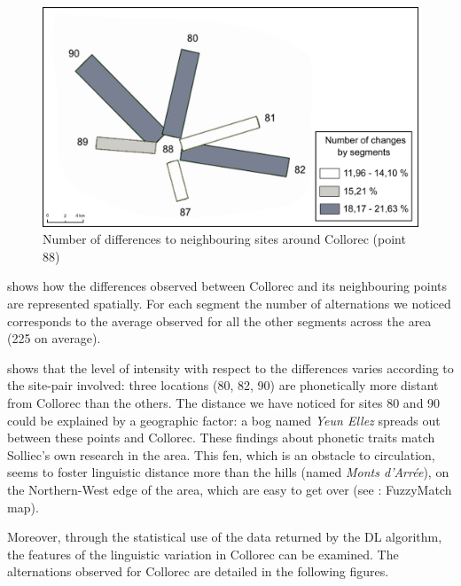 \documentclass[output=paper]{LSP/langsci}
\begin{document}
\begin{figure}
\includegraphics[width=\textwidth]{illustrations/brun_etal_fig7}
\caption{Number of differences to neighbouring sites around Collorec (point 88)}
\label{fig:7}
\end{figure}

 shows how the differences observed between Collorec and its neighbouring points are represented spatially. For each segment the number of alternations we noticed corresponds to the average observed for all the other segments across the area (225 on average).

 shows that the level of intensity with respect to the differences varies according to the site-pair involved: three locations (80, 82, 90) are phonetically more distant from Collorec than the others. The distance we have noticed for sites 80 and 90 could be explained by a geographic factor: a bog named \textit{Yeun Ellez} spreads out between these points and Collorec. These findings about phonetic traits match Solliec’s own research in the area. This fen, which is an obstacle to circulation, seems to foster linguistic distance more than the hills (named \textit{Monts d’Arrée}), on the Northern-West edge of the area, which are easy to get over (see : FuzzyMatch map).

Moreover, through the statistical use of the data returned by the DL algorithm, the features of the linguistic variation in Collorec can be examined. The alternations observed for Collorec are detailed in the following figures.
\end{document}
